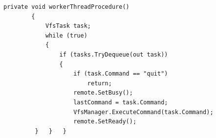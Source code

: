 \documentclass[a4paper,12pt]{article}
\begin{document}
\pagebreak

\begin{lstlisting}[label={lst:3},caption=Worker-Thread's Procedure]
        private void workerThreadProcedure()
        {
            VfsTask task;
            while (true)
            {
                if (tasks.TryDequeue(out task))
                {
                    if (task.Command == "quit")
                        return;
                    remote.SetBusy();
                    lastCommand = task.Command;
                    VfsManager.ExecuteCommand(task.Command);
                    remote.SetReady();
         }   }   }
\end{lstlisting}
\end{document}
